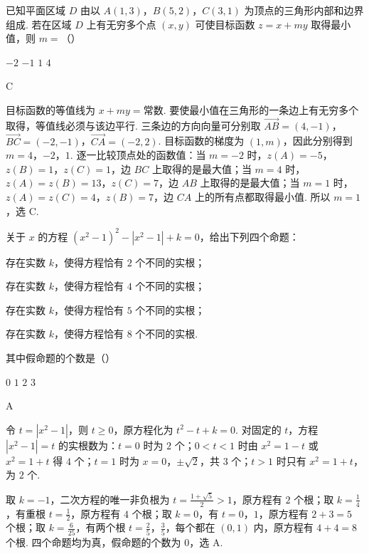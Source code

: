\begin{problem}
已知平面区域 \(D\) 由以 \(A(1,3)\)，\(B(5,2)\)，\(C(3,1)\) 为顶点的三角形内部和边界组成. 若在区域 \(D\) 上有无穷多个点 \((x, y)\) 可使目标函数 \(z = x + my\) 取得最小值，则 \(m =\)（\quad）

\choices
    {\(-2\)}
    {\(-1\)}
    {\(1\)}
    {\(4\)}
\end{problem}

\begin{answer}
C
\end{answer}

\begin{solution}
目标函数的等值线为 \(x+my=\text{常数}\). 要使最小值在三角形的一条边上有无穷多个取得，等值线必须与该边平行. 三条边的方向向量可分别取
\(\overrightarrow{AB}=(4,-1)\)，\(\overrightarrow{BC}=(-2,-1)\)，\(\overrightarrow{CA}=(-2,2)\).
目标函数的梯度为 \((1,m)\)，因此分别得到 \(m=4\)，\(-2\)，\(1\). 逐一比较顶点处的函数值：当 \(m=-2\) 时，\(z(A)=-5\)，\(z(B)=1\)，\(z(C)=1\)，边 \(BC\) 上取得的是最大值；当 \(m=4\) 时，\(z(A)=z(B)=13\)，\(z(C)=7\)，边 \(AB\) 上取得的是最大值；当 \(m=1\) 时，\(z(A)=z(C)=4\)，\(z(B)=7\)，边 \(CA\) 上的所有点都取得最小值. 所以 \(m=1\)，选 C.
\end{solution}

\begin{problem}
关于 \(x\) 的方程 \((x^{2} - 1)^{2} - |x^{2} - 1| + k = 0\)，给出下列四个命题：
\begin{circlelist}
\item 存在实数 \(k\)，使得方程恰有 \(2\) 个不同的实根；
\item 存在实数 \(k\)，使得方程恰有 \(4\) 个不同的实根；
\item 存在实数 \(k\)，使得方程恰有 \(5\) 个不同的实根；
\item 存在实数 \(k\)，使得方程恰有 \(8\) 个不同的实根.
\end{circlelist}
其中假命题的个数是（\quad）

\choices
    {\(0\)}
    {\(1\)}
    {\(2\)}
    {\(3\)}
\end{problem}

\begin{answer}
A
\end{answer}

\begin{solution}
令 \(t=|x^{2}-1|\)，则 \(t\geqslant0\)，原方程化为 \(t^{2}-t+k=0\). 对固定的 \(t\)，方程 \(|x^{2}-1|=t\) 的实根数为：\(t=0\) 时为 \(2\) 个；\(0<t<1\) 时由 \(x^{2}=1-t\) 或 \(x^{2}=1+t\) 得 \(4\) 个；\(t=1\) 时为 \(x=0\)，\(\pm\sqrt{2}\)，共 \(3\) 个；\(t>1\) 时只有 \(x^{2}=1+t\)，为 \(2\) 个.

取 \(k=-1\)，二次方程的唯一非负根为 \(t=\frac{1+\sqrt{5}}{2}>1\)，原方程有 \(2\) 个根；取 \(k=\frac14\)，有重根 \(t=\frac12\)，原方程有 \(4\) 个根；取 \(k=0\)，有 \(t=0\)，\(1\)，原方程有 \(2+3=5\) 个根；取 \(k=\frac{6}{25}\)，有两个根 \(t=\frac25\)，\(\frac35\)，每个都在 \((0,1)\) 内，原方程有 \(4+4=8\) 个根. 四个命题均为真，假命题的个数为 \(0\)，选 A.
\end{solution}

